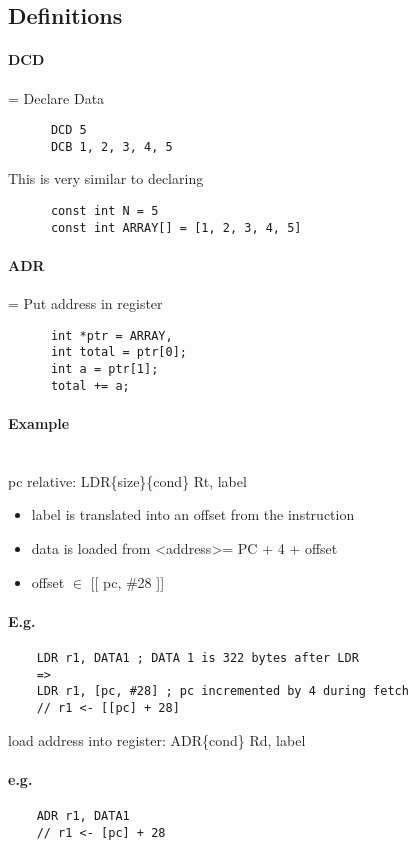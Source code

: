 \documentclass[12pt]{report}
\begin{document}
  \subsection{Definitions}
    \paragraph{DCD} = Declare Data
    \begin{lstlisting}
      DCD 5
      DCB 1, 2, 3, 4, 5
    \end{lstlisting}
    This is very similar to declaring
    \begin{lstlisting}
      const int N = 5
      const int ARRAY[] = [1, 2, 3, 4, 5]
    \end{lstlisting}

    \paragraph{ADR} = Put address in register
    \begin{lstlisting}
      int *ptr = ARRAY,
      int total = ptr[0];
      int a = ptr[1];
      total += a;
    \end{lstlisting}

  \paragraph{Example} ~\\
    pc relative: LDR\{size\}\{cond\} Rt, label
    \begin{itemize}
      \item label is translated into an offset from the instruction
      \item data is loaded from \textless address\textgreater = PC + 4 + offset
      \item offset $\in$ [[ pc, \#28 ]]
    \end{itemize}

  \paragraph{E.g.}
  \begin{lstlisting}
    LDR r1, DATA1 ; DATA 1 is 322 bytes after LDR
    =>
    LDR r1, [pc, #28] ; pc incremented by 4 during fetch
    // r1 <- [[pc] + 28]
  \end{lstlisting}

  load address into register: ADR\{cond\} Rd, label
  \paragraph{e.g.}
  \begin{lstlisting}
    ADR r1, DATA1
    // r1 <- [pc] + 28
  \end{lstlisting}
\end{document}
